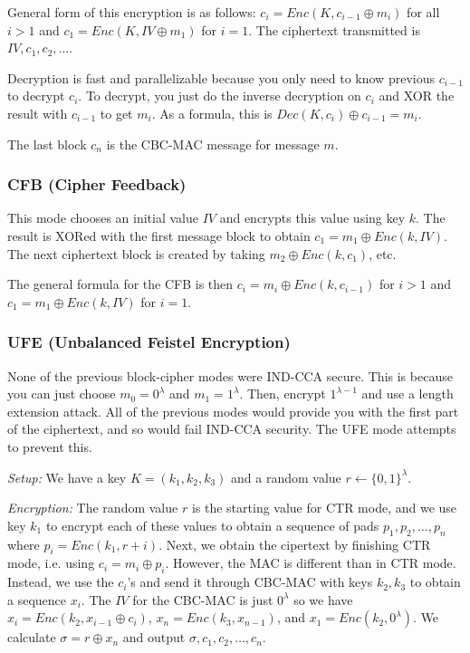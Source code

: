 \documentclass[psamsfonts]{amsart}
\begin{document}
General form of this encryption is as follows: $c_i = Enc(K, c_{i-1} \oplus m_i)$ for all $i > 1$ and $c_1 = Enc(K, IV \oplus m_1)$ for $i = 1$. The ciphertext transmitted is $IV, c_1, c_2, \ldots$.

Decryption is fast and parallelizable because you only need to know previous $c_{i-1}$ to decrypt $c_i$. To decrypt, you just do the inverse decryption on $c_i$ and XOR the result with $c_{i-1}$ to get $m_i$. As a formula, this is $Dec(K, c_{i}) \oplus c_{i-1} = m_i$.

The last block $c_n$ is the CBC-MAC message for message $m$.

\subsubsection{CFB (Cipher Feedback)}

This mode chooses an initial value $IV$ and encrypts this value using key $k$. The result is XORed with the first message block to obtain $c_1 = m_1 \oplus Enc(k, IV)$. The next ciphertext block is created by taking $m_2 \oplus Enc(k, c_1)$, etc.

The general formula for the CFB is then $c_i = m_i \oplus Enc(k, c_{i-1})$ for $i > 1$ and $c_1 = m_1 \oplus Enc(k, IV)$ for $i=1$.

\subsubsection{UFE (Unbalanced Feistel Encryption)}

None of the previous block-cipher modes were IND-CCA secure. This is because you can just choose $m_0 = 0^{\lambda}$ and $m_1 = 1^{\lambda}$. Then, encrypt $1^{\lambda-1}$ and use a length extension attack. All of the previous modes would provide you with the first part of the ciphertext, and so would fail IND-CCA security. The UFE mode attempts to prevent this.

\emph{Setup:} We have a key $K = (k_1, k_2, k_3)$ and a random value $r \leftarrow \{0,1\}^\lambda$. 

\emph{Encryption:} The random value $r$ is the starting value for CTR mode, and we use key $k_1$ to encrypt each of these values to obtain a sequence of pads $p_1, p_2, \ldots, p_n$ where $p_i = Enc(k_1, r+i)$. Next, we obtain the cipertext by finishing CTR mode, i.e. using $c_i = m_i \oplus p_i$. However, the MAC is different than in CTR mode. Instead, we use the $c_i$'s and send it through CBC-MAC with keys $k_2, k_3$ to obtain a sequence $x_i$. The $IV$ for the CBC-MAC is just $0^{\lambda}$ so we have $x_i = Enc(k_2, x_{i-1} \oplus c_i)$, $x_n = Enc(k_3, x_{n-1})$, and $x_1 = Enc(k_2, 0^{\lambda})$. We calculate $\sigma = r \oplus x_n$ and output $\sigma, c_1, c_2, \ldots, c_n$.
\end{document}
